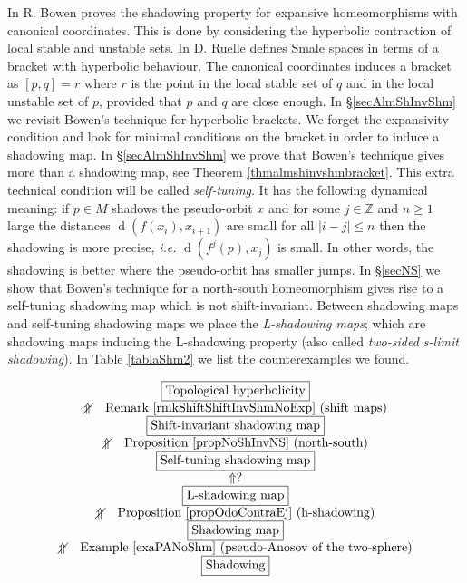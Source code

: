 \documentclass[12pt]{amsart}
\theoremstyle{plain}
\theoremstyle{definition}
\theoremstyle{remark}
\DeclareMathOperator{\dist}{d}
\newcommand{\Z}{\mathbb Z}
\newcommand{\nUparrow}{\Uparrow\hspace{-.34cm}\diagup\hspace{.31cm}}
\begin{document}
In \cite{Bowen75} R. Bowen proves the shadowing property for expansive homeomorphisms with canonical coordinates.
This is done by considering the hyperbolic contraction of local stable and unstable sets.
In \cite{Ruelle} D. Ruelle defines Smale spaces in terms of a bracket with  hyperbolic behaviour.
The canonical coordinates induces a bracket as $[p,q]=r$ where $r$ is the point in the local stable set of $q$ and in the local unstable set of $p$, provided that $p$ and $q$ are close enough.
In \S\ref{secAlmShInvShm} we revisit Bowen's technique for hyperbolic brackets. We forget the expansivity condition and look for minimal conditions on the bracket in order to induce a shadowing map. In \S\ref{secAlmShInvShm} we prove that Bowen's technique gives more than a shadowing map,
see Theorem \ref{thmalmshinvshmbracket}.
This extra technical condition will be called \textit{self-tuning}.
It has the following dynamical meaning: if $p\in M$ shadows the pseudo-orbit $x$ and for some $j\in\Z$ and $n\geq 1$ large the distances $\dist(f(x_i),x_{i+1})$ are small for all $|i-j|\leq n$ then the shadowing is more precise, \textit{i.e.} $\dist(f^j(p),x_j)$ is small.
In other words, the shadowing is better where the pseudo-orbit has smaller jumps.
In \S\ref{secNS} we show that Bowen's technique for a north-south homeomorphism gives rise to a self-tuning shadowing map which is not shift-invariant.
Between shadowing maps and self-tuning shadowing maps we place the \textit{L-shadowing maps}; which are shadowing maps inducing the L-shadowing property \cites{CaCo19,GMMT}
(also called \textit{two-sided s-limit shadowing}).
In Table \ref{tablaShm2} we list the counterexamples we found.
\begin{table}[ht]
	\[
	\begin{array}{c}
		\hbox{\fbox{Topological hyperbolicity}}\\
		\nUparrow \text{Remark \ref{rmkShiftShiftInvShmNoExp} (shift maps)}\\
		\hbox{\fbox{Shift-invariant shadowing map}}\\
		\nUparrow\text{Proposition \ref{propNoShInvNS}  (north-south)}\\
		\hbox{\fbox{Self-tuning shadowing map}}\\
		\Uparrow?\\
		\hbox{\fbox{L-shadowing map}}\\
		\nUparrow\text{Proposition \ref{propOdoContraEj} (h-shadowing)}\\
		\hbox{\fbox{Shadowing map}}\\
		\nUparrow\text{Example \ref{exaPANoShm} (pseudo-Anosov of the two-sphere)}\\
		\hbox{\fbox{Shadowing}}
	\end{array}
	\]
	\caption{Summary of counterexamples. We could not solve whether or not every L-shadowing map has self-tuning.}
	\label{tablaShm2}
\end{table}
\end{document}
